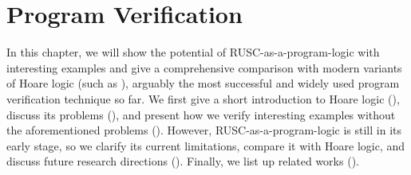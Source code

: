 \chapter{\;\;\;\;Program Verification}
\label{sec:program}

In this chapter, we will show the potential of RUSC-as-a-program-logic with interesting examples and give a comprehensive comparison with modern variants of Hoare logic (such as \cite{VST}), arguably the most successful and widely used program verification technique so far.
We first give a short introduction to Hoare logic (), discuss its problems (), and present how we verify interesting examples without the aforementioned problems ().
However, RUSC-as-a-program-logic is still in its early stage, so we clarify its current limitations, compare it with Hoare logic, and discuss future research directions ().
Finally, we list up related works ().








